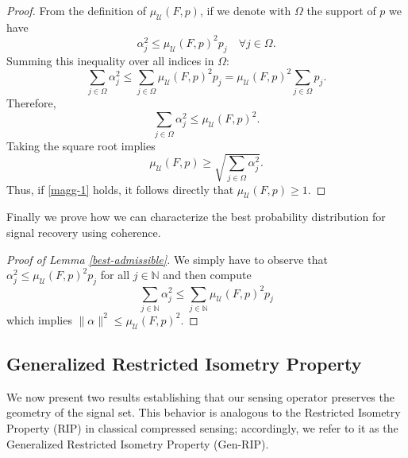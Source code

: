 \documentclass[a4paper,oneside]{amsart}
\newcommand{\N}{\mathbb{N}}
\begin{document}
\begin{proof}
  
From the definition of $ \mu_{\mathcal{U}}(F,p) $, if we denote with $\Omega$ the support of $p$ we have
    \begin{equation*}
        \alpha_j^2 \leq \mu_{\mathcal{U}}(F,p)^2 p_j \quad \forall j \in \Omega.
    \end{equation*}
    Summing this inequality over all indices in $\Omega$:
    \begin{equation*}
        \sum_{j \in \Omega} \alpha_j^2 \leq \sum_{j \in \Omega} \mu_{\mathcal{U}}(F,p)^2 p_j = \mu_{\mathcal{U}}(F,p)^2 \sum_{j \in \Omega} p_j.
    \end{equation*}
    Therefore,
    \begin{equation*}
        \sum_{j \in \Omega} \alpha_j^2 \leq \mu_{\mathcal{U}}(F,p)^2.
    \end{equation*}
    Taking the square root implies
    \begin{equation*}
        \mu_{\mathcal{U}}(F,p) \geq \sqrt{\sum_{j \in \Omega} \alpha_j^2}.
    \end{equation*}
    Thus, if \eqref{magg-1} holds, it follows directly that $\mu_{\mathcal{U}}(F,p) \geq 1$.
\end{proof}

Finally we prove how we can characterize the best probability distribution for signal recovery using coherence.
\begin{proof}[Proof of Lemma \ref{best-admissible}]
    We simply have to observe that $\alpha_j^2 \leq \mu_{\mathcal{U}}(F,p)^2 p_j$ for all $j\in\N$ and then compute
    \begin{equation*}
        \sum_{j\in\mathbb{N}} \alpha_j^2 \leq \sum_{j\in\mathbb{N}} \mu_{\mathcal{U}}(F,p)^2 p_j
    \end{equation*}
    which implies $\|\alpha\|^2 \leq \mu_{\mathcal{U}}(F,p)^2 $.
\end{proof}



\subsection{Generalized Restricted Isometry Property}
We now present two results establishing that our sensing operator preserves the geometry of the signal set. This behavior is analogous to the Restricted Isometry Property (RIP) in classical compressed sensing; accordingly, we refer to it as the Generalized Restricted Isometry Property (Gen-RIP). 
\end{document}
